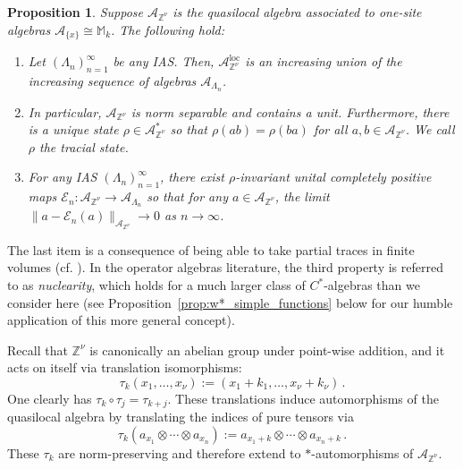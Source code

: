 \documentclass{article}
\newcommand{\Znu}{\mathbb{Z}^\nu}
\newcommand{\A}{\mathcal{A}}
\newcommand{\M}{\mathbb{M}}
\DeclareMathOperator{\loc}{loc}
\newcommand{\<}{\langle}
\renewcommand{\>}{\rangle}
\newtheorem{prop}[thm]{Proposition}
\theoremstyle{definition}
\numberwithin{equation}{section}
\begin{document}
\begin{prop}
    Suppose $\A_{\Znu}$ is the quasilocal algebra associated to one-site algebras $\A_{\{x\}}\cong \M_k$. The following hold: 
    \begin{enumerate}
        \item Let $(\Lambda_n)_{n=1}^\infty$ be any IAS. Then, $\A_{\Znu}^{\loc}$ is an increasing union of the increasing sequence of algebras $\A_{\Lambda_n}$. 
        \item In particular, $\A_{\Znu}$ is norm separable and contains a unit. Furthermore, there is a unique state $\rho\in \A_{\Znu}^*$ so that $\rho(ab) = \rho(ba)$ for all $a,b\in \A_{\Znu}$. We call $\rho$ the \emph{tracial state}.
        \item For any IAS $(\Lambda_n)_{n=1}^\infty$, there exist $\rho$-invariant unital completely positive maps $\mathcal{E}_n:\A_{\Znu} \to \A_{\Lambda_n}$ so that for any $a\in \A_{\Znu}$, the limit $\|a - \mathcal{E}_n(a)\|_{\A_{\Znu}} \to 0$ as $n\to \infty$. 
    \end{enumerate}
\end{prop} The last item is a consequence of being able to take partial traces in finite volumes (cf. \cite{NachtergaeleScholzWerner, NachtergaeleSimsYoung}). In the operator algebras literature,  the third property is referred to as \emph{nuclearity}, which holds for a much larger class of $C^*$-algebras than we consider here (see Proposition~\ref{prop:w*_simple_functions} below for our humble application of this more general concept). 

Recall that $\Znu$ is canonically an abelian group under point-wise addition, and it acts on itself via translation isomorphisms: 
    \[
        \tau_k(x_1, \dots, x_\nu) := (x_1 +k_1, \dots, x_\nu +k_\nu)\,.
    \] One clearly has $\tau_{k}\circ \tau_j = \tau_{k+j}$. These translations induce automorphisms of the quasilocal algebra by translating the indices of pure tensors via
    \[
        \tau_k(a_{x_1} \otimes \cdots \otimes a_{x_n}) := a_{x_1 +k}\otimes \cdots \otimes a_{x_n +k}\,.
    \] These $\tau_k$ are norm-preserving and therefore extend to $\ast$-automorphisms of $\A_{\Znu}$.
\end{document}
